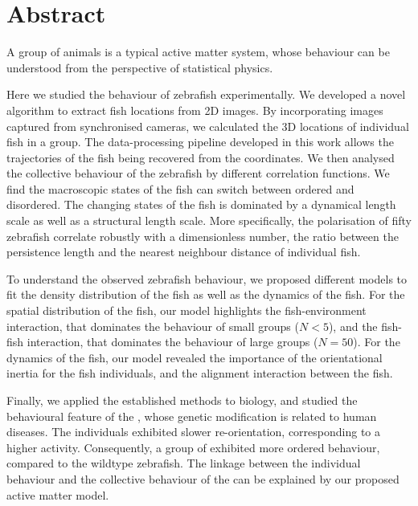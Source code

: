 \documentclass[11pt,twoside]{report}
\begin{document}
\cleardoublepage
\chapter*{Abstract}

A group of animals is a typical active matter system, whose behaviour can be understood from the perspective of statistical physics.

Here we studied the behaviour of zebrafish experimentally. We developed a novel algorithm to extract fish locations from 2D images. By incorporating images captured from synchronised cameras, we calculated the 3D locations of individual fish in a group. The data-processing pipeline developed in this work allows the trajectories of the fish being recovered from the coordinates.
We then analysed the collective behaviour of the zebrafish by different correlation functions. We find the macroscopic states of the fish can switch between ordered and disordered.
The changing states of the fish is dominated by a dynamical length scale as well as a structural length scale.
More specifically, the polarisation of fifty zebrafish correlate robustly with a dimensionless number, the ratio between the persistence length and the nearest neighbour distance of individual fish.

To understand the observed zebrafish behaviour, we proposed different models to fit the density distribution of the fish as well as the dynamics of the fish.
For the spatial distribution of the fish, our model highlights the fish-environment interaction, that dominates the behaviour of small groups ($N < 5$), and the fish-fish interaction, that dominates the behaviour of large groups ($N = 50$). 
For the dynamics of the fish, our model revealed the importance of the orientational inertia for the fish individuals, and the alignment interaction between the fish.

Finally, we applied the established methods to biology, and studied the behavioural feature of the {\mf}, whose genetic modification is related to human diseases. The {\mf} individuals exhibited slower re-orientation, corresponding to a higher activity. Consequently, a group of {\mf} exhibited more ordered behaviour, compared to the wildtype zebrafish. The linkage between the individual behaviour and the collective behaviour of the {\mf} can be explained by our proposed active matter model.



\cleardoublepage
\chapter*{}
\vspace*{0.1\textheight}
\end{document}
